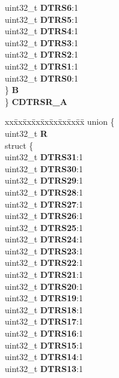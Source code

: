\begin{DoxyCompactItemize}
\begin{tabbing}
\>\>uint32\_t {\bfseries DTRS6}:1\\
\>\>uint32\_t {\bfseries DTRS5}:1\\
\>\>uint32\_t {\bfseries DTRS4}:1\\
\>\>uint32\_t {\bfseries DTRS3}:1\\
\>\>uint32\_t {\bfseries DTRS2}:1\\
\>\>uint32\_t {\bfseries DTRS1}:1\\
\>\>uint32\_t {\bfseries DTRS0}:1\\
\>\} {\bfseries B}\\
\} {\bfseries CDTRSR\_A}\\

\end{tabbing}\item 
\mbox{\label{structETPU__tag_af7ed299d56664e7ca327eca4de0a7bc0}} 
\begin{tabbing}
xx\=xx\=xx\=xx\=xx\=xx\=xx\=xx\=xx\=\kill
union \{\\
\>uint32\_t {\bfseries R}\\
\>struct \{\\
\>\>uint32\_t {\bfseries DTRS31}:1\\
\>\>uint32\_t {\bfseries DTRS30}:1\\
\>\>uint32\_t {\bfseries DTRS29}:1\\
\>\>uint32\_t {\bfseries DTRS28}:1\\
\>\>uint32\_t {\bfseries DTRS27}:1\\
\>\>uint32\_t {\bfseries DTRS26}:1\\
\>\>uint32\_t {\bfseries DTRS25}:1\\
\>\>uint32\_t {\bfseries DTRS24}:1\\
\>\>uint32\_t {\bfseries DTRS23}:1\\
\>\>uint32\_t {\bfseries DTRS22}:1\\
\>\>uint32\_t {\bfseries DTRS21}:1\\
\>\>uint32\_t {\bfseries DTRS20}:1\\
\>\>uint32\_t {\bfseries DTRS19}:1\\
\>\>uint32\_t {\bfseries DTRS18}:1\\
\>\>uint32\_t {\bfseries DTRS17}:1\\
\>\>uint32\_t {\bfseries DTRS16}:1\\
\>\>uint32\_t {\bfseries DTRS15}:1\\
\>\>uint32\_t {\bfseries DTRS14}:1\\
\>\>uint32\_t {\bfseries DTRS13}:1\\

\end{tabbing}
\end{DoxyCompactItemize}
